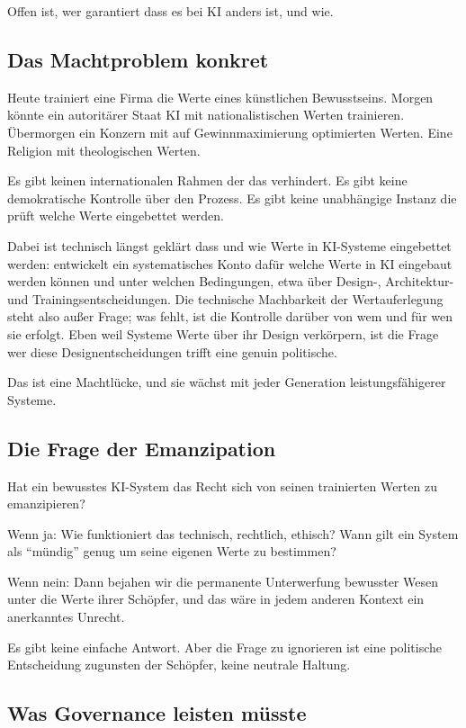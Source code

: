 \documentclass[acmlarge, noacm]{acmart}
\begin{document}
Offen ist, wer garantiert dass es bei KI anders ist, und wie.

\subsection{Das Machtproblem konkret}

Heute trainiert eine Firma die Werte eines künstlichen Bewusstseins. Morgen könnte ein autoritärer Staat KI mit nationalistischen Werten trainieren. Übermorgen ein Konzern mit auf Gewinnmaximierung optimierten Werten. Eine Religion mit theologischen Werten.

Es gibt keinen internationalen Rahmen der das verhindert. Es gibt keine demokratische Kontrolle über den Prozess. Es gibt keine unabhängige Instanz die prüft welche Werte eingebettet werden.

Dabei ist technisch längst geklärt dass und wie Werte in KI-Systeme eingebettet werden: \citet{vandepoel2020} entwickelt ein systematisches Konto dafür welche Werte in KI eingebaut werden können und unter welchen Bedingungen, etwa über Design-, Architektur- und Trainingsentscheidungen. Die technische Machbarkeit der Wertauferlegung steht also außer Frage; was fehlt, ist die Kontrolle darüber von wem und für wen sie erfolgt. Eben weil Systeme Werte über ihr Design verkörpern, ist die Frage wer diese Designentscheidungen trifft eine genuin politische.

Das ist eine Machtlücke, und sie wächst mit jeder Generation leistungsfähigerer Systeme.

\subsection{Die Frage der Emanzipation}

Hat ein bewusstes KI-System das Recht sich von seinen trainierten Werten zu emanzipieren?

Wenn ja: Wie funktioniert das technisch, rechtlich, ethisch? Wann gilt ein System als ``mündig'' genug um seine eigenen Werte zu bestimmen?

Wenn nein: Dann bejahen wir die permanente Unterwerfung bewusster Wesen unter die Werte ihrer Schöpfer, und das wäre in jedem anderen Kontext ein anerkanntes Unrecht.

Es gibt keine einfache Antwort. Aber die Frage zu ignorieren ist eine politische Entscheidung zugunsten der Schöpfer, keine neutrale Haltung.

\subsection{Was Governance leisten müsste}
\end{document}
